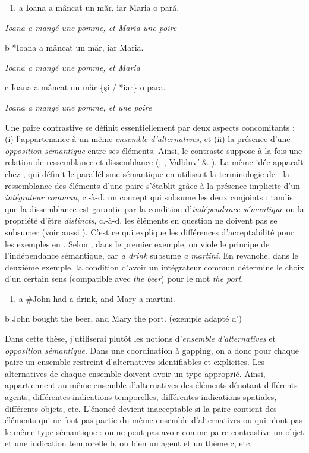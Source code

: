 \begin{enumerate}
\item \label{bkm:Ref289438493}a  Ioana a mâncat un măr, iar Maria o pară.


\end{enumerate}
{\itshape
Ioana a mangé une pomme, et Maria une poire } 

  b  *Ioana a mâncat un măr, iar Maria. 

    \textit{Ioana a mangé une pomme, et Maria}

  c  Ioana a mâncat un măr \{şi / *iar\} o pară. 

    \textit{Ioana a mangé une pomme, et une poire } 

Une paire contrastive se définit essentiellement par deux aspects concomitants : (i) l'appartenance à un même \textit{ensemble d'alternatives}, et (ii) la présence d'une \textit{opposition sémantique} entre ses éléments. Ainsi, le contraste suppose à la fois une relation de ressemblance et dissemblance (\citet{Sag1976}, \citet{Rooth1992}, Vallduví \& \citet{Vilkuna1998}). La même idée apparaît chez \citet{Umbach2005}, qui définit le parallélisme sémantique en utilisant la terminologie de \citet{Lang1984} : la ressemblance des éléments d'une paire s'établit grâce à la présence implicite d'un \textit{intégrateur commun}, c.-à-d. un concept qui subsume les deux conjoints ; tandis que la dissemblance est garantie par la condition d'\textit{indépendance sémantique} ou la propriété d'être \textit{distincts}, c.-à-d. les éléments en question ne doivent pas se subsumer (voir aussi \citet{Zeevat2004}). C'est ce qui explique les différences d'acceptabilité pour les exemples en . Selon \citet{Umbach2005}, dans le premier exemple, on viole le principe de l'indépendance sémantique, car \textit{a drink} subsume \textit{a martini}. En revanche, dans le deuxième exemple, la condition d'avoir un intégrateur commun détermine le choix d'un certain sens (compatible avec \textit{the beer}) pour le mot \textit{the port}.  


\begin{enumerate}
\item \label{bkm:Ref289436982}a   \#John had a drink, and Mary a martini.


\end{enumerate}
b  John bought the beer, and Mary the port.    (exemple adapté d'\citet{Umbach2005})

Dans cette thèse, j'utiliserai plutôt les notions d'\textit{ensemble d'alternatives} et \textit{opposition sémantique}. Dans une coordination à gapping, on a donc pour chaque paire un ensemble restreint d'alternatives identifiables et explicites. Les alternatives de chaque ensemble doivent avoir un type approprié. Ainsi, appartiennent au même ensemble d'alternatives des éléments dénotant différents agents, différentes indications temporelles, différentes indications spatiales, différents objets, etc. L'énoncé devient inacceptable si la paire contient des éléments qui ne font pas partie du même ensemble d'alternatives ou qui n'ont pas le même type sémantique  : on ne peut pas avoir comme paire contrastive un objet et une indication temporelle b, ou bien un agent et un thème c, etc.


